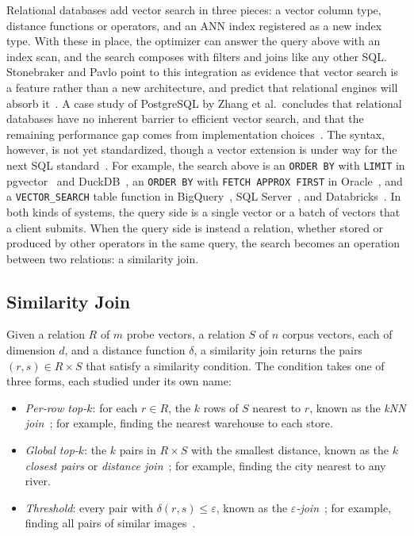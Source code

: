 Relational databases add vector search in three pieces: a vector column type, distance functions or operators, and an ANN index registered as a new index type.
With these in place, the optimizer can answer the query above with an index scan, and the search composes with filters and joins like any other SQL\@.
Stonebraker and Pavlo point to this integration as evidence that vector search is a feature rather than a new architecture, and predict that relational engines will absorb it~\cite{StonebrakerPavloAround24}.
A case study of PostgreSQL by Zhang et al.\ concludes that relational databases have no inherent barrier to efficient vector search, and that the remaining performance gap comes from implementation choices~\cite{ZhangPgLimits24}.
The syntax, however, is not yet standardized, though a vector extension is under way for the next SQL standard~\cite{EisentrautSQL202y25}.
For example, the search above is an \texttt{ORDER BY} with \texttt{LIMIT} in pgvector~\cite{PgvectorRepo} and DuckDB~\cite{DuckDBVSS}, an \texttt{ORDER BY} with \texttt{FETCH APPROX FIRST} in Oracle~\cite{OracleAIVectorSearch}, and a \texttt{VECTOR\_SEARCH} table function in BigQuery~\cite{BigQueryVectorSearchFn}, SQL Server~\cite{SQLServerVectorSearchFn}, and Databricks~\cite{DatabricksVectorSearchFn26}.
In both kinds of systems, the query side is a single vector or a batch of vectors that a client submits.
When the query side is instead a relation, whether stored or produced by other operators in the same query, the search becomes an operation between two relations: a similarity join.

\subsection{Similarity Join}\label{subsec:vector-join}

Given a relation $R$ of $m$ probe vectors, a relation $S$ of $n$ corpus vectors, each of dimension $d$, and a distance function $\delta$, a similarity join returns the pairs $(r, s) \in R \times S$ that satisfy a similarity condition.
The condition takes one of three forms, each studied under its own name:
\begin{itemize}
    \item \emph{Per-row top-$k$}: for each $r \in R$, the $k$ rows of $S$ nearest to $r$, known as the \emph{kNN join}~\cite{BohmKrebsKNNJoin04}; for example, finding the nearest warehouse to each store.
    \item \emph{Global top-$k$}: the $k$ pairs in $R \times S$ with the smallest distance, known as the \emph{$k$ closest pairs} or \emph{distance join}~\cite{HjaltasonSametDistJoin98, CorralClosestPair00}; for example, finding the city nearest to any river.
    \item \emph{Threshold}: every pair with $\delta(r, s) \le \varepsilon$, known as the \emph{$\varepsilon$-join}~\cite{ShimSimJoin97, KoudasSevcik98}; for example, finding all pairs of similar images~\cite{ShimSimJoin97}.
\end{itemize}

